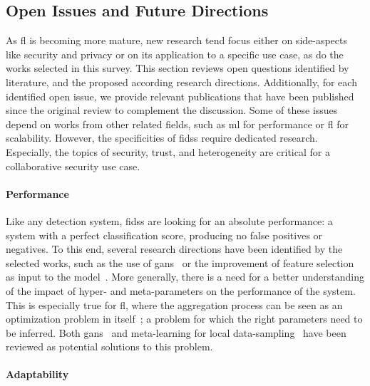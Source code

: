 \subsection{Open Issues and Future Directions\label{sec:sota.discuss.open}}

As \gls{fl} is becoming more mature, new research tend focus either on side-aspects like security and privacy \cite{bonawitz_PracticalSecureAggregation_2017,fung_LimitationsFederatedLearning_2020,dong_EaSTFLyEfficientsecure_2020,nguyen_PoisoningAttacksFederated_2020b,mothukuri_surveysecurityprivacy_2021} or on its application to a specific use case, as do the works selected in this survey.
This section reviews open questions identified by literature, and the proposed according research directions.
Additionally, for each identified open issue, we provide relevant publications that have been published since the original review to complement the discussion.
Some of these issues depend on works from other related fields, such as \gls{ml} for performance or \gls{fl} for scalability.
However, the specificities of \glspl{fids} require dedicated research.
Especially, the topics of security, trust, and heterogeneity are critical for a collaborative security use case.


\paragraph{Performance}

Like any detection system, \glspl{fids} are looking for an absolute performance: a system with a perfect classification score, producing no false positives or negatives.
To this end, several research directions have been identified by the selected works, such as the use of \glspl{gan}~\cite{schneble_Attackdetectionusing_2019} or the improvement of feature selection as input to the model~\cite{sun_AdaptiveIntrusionDetection_2021}.
More generally, there is a need for a better understanding of the impact of hyper- and meta-parameters on the performance of the system.
This is especially true for \gls{fl}, where the aggregation process can be seen as an optimization problem in itself~\cite{charles_ConvergenceAccuracyTradeOffs_2021}; a problem for which the right parameters need to be inferred.
Both \glspl{gan}~\cite{jin_FLIIDSnovelfederated_2024} and meta-learning for local data-sampling~\cite{he_6GenabledConsumerElectronics_2023} have been reviewed as potential solutions to this problem.


\paragraph{Adaptability}

